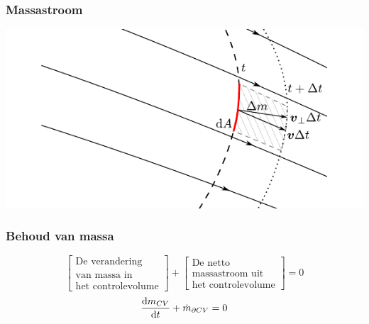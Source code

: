 \documentclass[t]{beamer}
\begin{document}
	\begin{frame}
		\frametitle{Massastroom}
		\vspace{1cm}
		\center
		\includegraphics{fig/controlevolumes/massastroom}
  	\end{frame}
	\begin{frame}
		\frametitle{Behoud van massa}
		\vspace{1cm}
		\begin{equation*}
			\left[
				\begin{array}{c}
					\mbox{De verandering} \\ \mbox{van massa in} \\ \mbox{het controlevolume}
				\end{array}
			\right]
			+
			\left[
				\begin{array}{c}
					\mbox{De netto} \\ \mbox{massastroom uit} \\ \mbox{het controlevolume}
				\end{array}
			\right]
			= 0
			\label{eqn:controlevolume,behoud van massa,woorden}
		\end{equation*}
		\vspace{1cm}
		\pause
		\begin{equation}
			\frac{\mathrm{d} m_{CV}}{\mathrm{d} t} + \dot{m}_{\partial CV} = 0
			\label{eqn:controlevolume,behoud van massa}
		\end{equation}
	\end{frame}	
\end{document}
